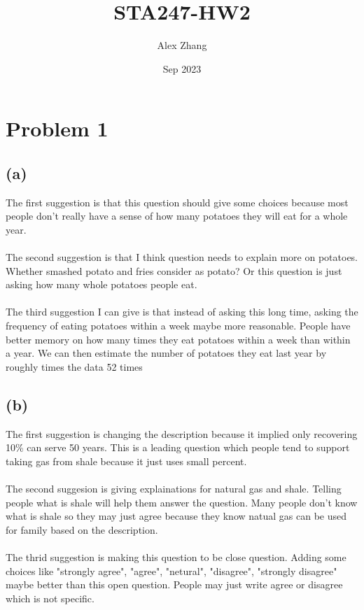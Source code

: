 \documentclass{article}
\title{STA247-HW2}
\author{Alex Zhang}
\date{Sep 2023}
\begin{document}
\maketitle
\section*{Problem 1}
\subsection*{(a)}
The first suggestion is that this question should give some choices because most people don't really have a sense of how many potatoes they will eat for a whole year.\\
\\
The second suggestion is that I think question needs to explain more on potatoes. Whether smashed potato and fries consider as potato?
Or this question is just asking how many whole potatoes people eat.\\
\\
The third suggestion I can give is that instead of asking this long time, asking the frequency of eating potatoes within a week maybe more reasonable.
People have better memory on how many times they eat potatoes within a week than within a year. We can then estimate the number of potatoes they eat last year by roughly times the data 52 times\\



\subsection*{(b)}
The first suggestion is changing the description because it implied only recovering 10\% can serve 50 years. This is a leading question which people tend to support taking gas from shale because it just uses small percent.\\
\\
The second suggesion is giving explainations for natural gas and shale. Telling people what is shale will help them answer the question. Many people don't know what is shale so they may just agree because they know natual gas can be used for family based on the description.\\
\\
The thrid suggestion is making this question to be close question. Adding some choices like "strongly agree", "agree", "netural", "disagree", "strongly disagree" maybe better than this open question.
People may just write agree or disagree which is not specific.\\
\end{document}

